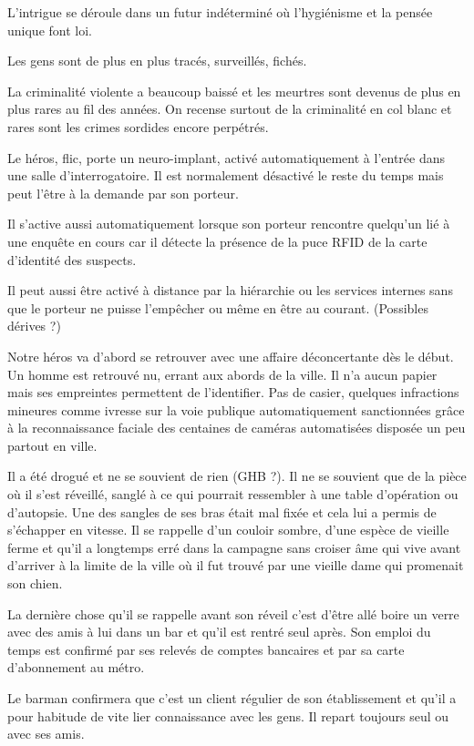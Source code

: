 L'intrigue se déroule dans un futur indéterminé où l'hygiénisme et la pensée
unique font loi.

Les gens sont de plus en plus tracés, surveillés, fichés.

La criminalité violente a beaucoup baissé et les meurtres sont devenus de plus
en plus rares au fil des années. On recense surtout de la criminalité en col
blanc et rares sont les crimes sordides encore perpétrés.

Le héros, flic, porte un neuro-implant, activé automatiquement à l'entrée dans
une salle d'interrogatoire. Il est normalement désactivé le reste du temps mais
peut l'être à la demande par son porteur.

Il s'active aussi automatiquement lorsque son porteur rencontre quelqu'un lié à
une enquête en cours car il détecte la présence de la puce RFID de la carte
d'identité des suspects.

Il peut aussi être activé à distance par la hiérarchie ou les services internes
sans que le porteur ne puisse l'empêcher ou même en être au courant. (Possibles
dérives ?)

Notre héros va d'abord se retrouver avec une affaire déconcertante dès le
début. Un homme est retrouvé nu, errant aux abords de la ville. Il n'a aucun
papier mais ses empreintes permettent de l'identifier. Pas de casier, quelques
infractions mineures comme ivresse sur la voie publique automatiquement
sanctionnées grâce à la reconnaissance faciale des centaines de caméras
automatisées disposée un peu partout en ville.

Il a été drogué et ne se souvient de rien (GHB ?). Il ne se souvient que de la
pièce où il s'est réveillé, sanglé à ce qui pourrait ressembler à une table
d'opération ou d'autopsie. Une des sangles de ses bras était mal fixée et cela
lui a permis de s'échapper en vitesse. Il se rappelle d'un couloir sombre,
d'une espèce de vieille ferme et qu'il a longtemps erré dans la campagne sans
croiser âme qui vive avant d'arriver à la limite de la ville où il fut trouvé
par une vieille dame qui promenait son chien.

La dernière chose qu'il se rappelle avant son réveil c'est d'être allé boire un
verre avec des amis à lui dans un bar et qu'il est rentré seul après. Son
emploi du temps est confirmé par ses relevés de comptes bancaires et par sa
carte d'abonnement au métro.

Le barman confirmera que c'est un client régulier de son établissement et qu'il
a pour habitude de vite lier connaissance avec les gens. Il repart toujours
seul ou avec ses amis.

